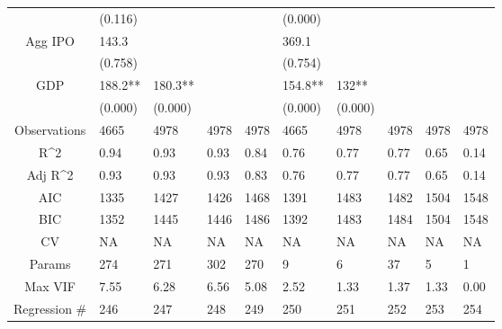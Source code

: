 \documentclass{article}
\begin{document}
\begin{table}[H]
\begin{tabular}{|clllllllll|}
   & (0.116) &  &  &  & (0.000) &  &  &  &  \\ 
  Agg IPO & 143.3 &  &  &  & 369.1 &  &  &  &  \\ 
   & (0.758) &  &  &  & (0.754) &  &  &  &  \\ 
  GDP & 188.2** & 180.3** &  &  & 154.8** & 132** &  &  &  \\ 
   & (0.000) & (0.000) &  &  & (0.000) & (0.000) &  &  &  \\ 
  \hline 
 Observations & 4665 & 4978 & 4978 & 4978 & 4665 & 4978 & 4978 & 4978 & 4978 \\ 
  R^2 & 0.94 & 0.93 & 0.93 & 0.84 & 0.76 & 0.77 & 0.77 & 0.65 & 0.14 \\ 
  Adj R^2 & 0.93 & 0.93 & 0.93 & 0.83 & 0.76 & 0.77 & 0.77 & 0.65 & 0.14 \\ 
  AIC & 1335 & 1427 & 1426 & 1468 & 1391 & 1483 & 1482 & 1504 & 1548 \\ 
  BIC & 1352 & 1445 & 1446 & 1486 & 1392 & 1483 & 1484 & 1504 & 1548 \\ 
  CV & NA & NA & NA & NA & NA & NA & NA & NA & NA \\ 
  Params & 274 & 271 & 302 & 270 & 9 & 6 & 37 & 5 & 1 \\ 
  Max VIF & 7.55 & 6.28 & 6.56 & 5.08 & 2.52 & 1.33 & 1.37 & 1.33 & 0.00 \\ 
  Regression \# & 246 & 247 & 248 & 249 & 250 & 251 & 252 & 253 & 254 \\ 
   \hline
\end{tabular}
 
\end{table}
\end{document}
